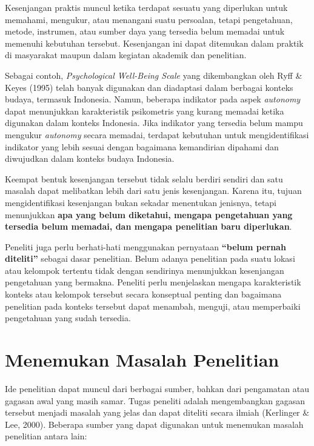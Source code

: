 \documentclass[
  indonesian,
  letterpaper,
  DIV=11,
  numbers=noendperiod]{scrreprt}
\begin{document}
\begin{enumerate}
  Kesenjangan praktis muncul ketika terdapat sesuatu yang diperlukan
  untuk memahami, mengukur, atau menangani suatu persoalan, tetapi
  pengetahuan, metode, instrumen, atau sumber daya yang tersedia belum
  memadai untuk memenuhi kebutuhan tersebut. Kesenjangan ini dapat
  ditemukan dalam praktik di masyarakat maupun dalam kegiatan akademik
  dan penelitian.

  Sebagai contoh, \emph{Psychological Well-Being Scale} yang
  dikembangkan oleh Ryff \& Keyes (1995) telah banyak digunakan dan
  diadaptasi dalam berbagai konteks budaya, termasuk Indonesia. Namun,
  beberapa indikator pada aspek \emph{autonomy} dapat menunjukkan
  karakteristik psikometris yang kurang memadai ketika digunakan dalam
  konteks Indonesia. Jika indikator yang tersedia belum mampu mengukur
  \emph{autonomy} secara memadai, terdapat kebutuhan untuk
  mengidentifikasi indikator yang lebih sesuai dengan bagaimana
  kemandirian dipahami dan diwujudkan dalam konteks budaya Indonesia.
\end{enumerate}

Keempat bentuk kesenjangan tersebut tidak selalu berdiri sendiri dan
satu masalah dapat melibatkan lebih dari satu jenis kesenjangan. Karena
itu, tujuan mengidentifikasi kesenjangan bukan sekadar menentukan
jenisnya, tetapi menunjukkan \textbf{apa yang belum diketahui, mengapa
pengetahuan yang tersedia belum memadai, dan mengapa penelitian baru
diperlukan}.

Peneliti juga perlu berhati-hati menggunakan pernyataan \textbf{``belum
pernah diteliti''} sebagai dasar penelitian. Belum adanya penelitian
pada suatu lokasi atau kelompok tertentu tidak dengan sendirinya
menunjukkan kesenjangan pengetahuan yang bermakna. Peneliti perlu
menjelaskan mengapa karakteristik konteks atau kelompok tersebut secara
konseptual penting dan bagaimana penelitian pada konteks tersebut dapat
menambah, menguji, atau memperbaiki pengetahuan yang sudah tersedia.

\section{Menemukan Masalah
Penelitian}\label{menemukan-masalah-penelitian}

Ide penelitian dapat muncul dari berbagai sumber, bahkan dari pengamatan
atau gagasan awal yang masih samar. Tugas peneliti adalah mengembangkan
gagasan tersebut menjadi masalah yang jelas dan dapat diteliti secara
ilmiah (Kerlinger \& Lee, 2000). Beberapa sumber yang dapat digunakan
untuk menemukan masalah penelitian antara lain:
\end{document}
